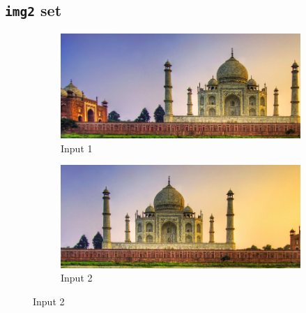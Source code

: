 \documentclass[a4paper,11]{article}
\begin{document}
  
  \subsection{\texttt{img2} set}
    \begin{figure}[H]
      \begin{subfigure}{.5\textwidth}
	\centering
	\includegraphics[width=.8\linewidth]{img2_1}
	\caption{Input 1}
      \end{subfigure}
      \begin{subfigure}{.5\textwidth}
	\centering
	\includegraphics[width=.8\linewidth]{img2_2}
	\caption{Input 2}
      \end{subfigure}
      \end{figure}
\end{document}
